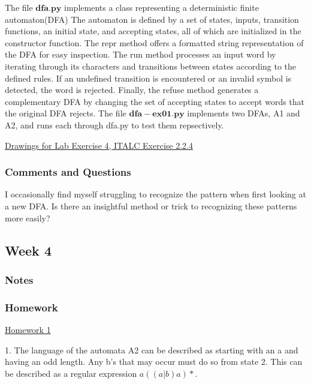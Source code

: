 \documentclass{article}
\theoremstyle{theorem}
\theoremstyle{definition}
\theoremstyle{remark}
\begin{document}
The file $\mathbf{dfa.py}$ implements a class representing a deterministic finite automaton(DFA) The automaton is defined by a set of states, inputs, transition functions, an initial state, and accepting states, all of which are initialized in the constructor function. The repr method offers a formatted string representation of the DFA for easy inspection. The run method processes an input word by iterating through its characters and transitions between states according to the defined rules. If an undefined transition is encountered or an invalid symbol is detected, the word is rejected. Finally, the refuse method generates a complementary DFA by changing the set of accepting states to accept words that the original DFA rejects.
\newline
The file $\mathbf{dfa-ex01.py}$ implements two DFAs, A1 and A2, and runs each through dfa.py to test them repsectively.




\underline{Drawings for Lab Exercise 4, ITALC Exercise 2.2.4}



\subsubsection*{Comments and Questions}

I occasionally find myself struggling to recognize the pattern when first looking at a new DFA. Is there an insightful method or trick to recognizing these patterns more easily?

\subsection{Week 4}

\subsubsection*{Notes}

\subsubsection*{Homework}

\underline{Homework 1}

1. The language of the automata A2 can be described as starting with an a and having an odd length. Any b's that may occur must do so from state 2. This can be described as a regular expression $a((a|b)a)*$.
\end{document}
